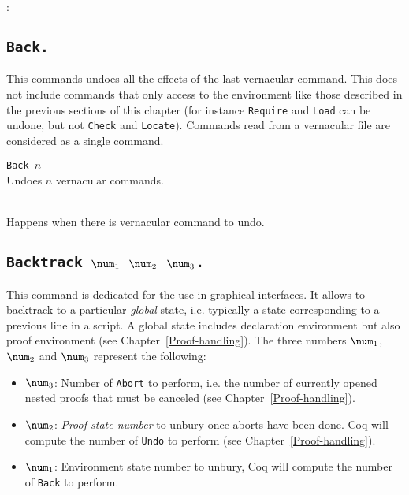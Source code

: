 \begin{ErrMsgs}
\item \ident: 
\end{ErrMsgs}

\subsection[\tt Back.]{\tt Back.}

This commands undoes all the effects of the last vernacular
command. This does not include commands that only access to the
environment like those described in the previous sections of this
chapter (for instance {\tt Require} and {\tt Load} can be undone, but
not {\tt Check} and {\tt Locate}). Commands read from a vernacular
file are considered as a single command.

\begin{Variants}
\item {\tt Back $n$} \\
  Undoes $n$ vernacular commands.
\end{Variants}

\begin{ErrMsgs}
\item {} \\
  Happens when there is vernacular command to undo.
\end{ErrMsgs}

\subsection[\tt Backtrack $\num_1$ $\num_2$ $\num_3$.]{\tt Backtrack $\num_1$ $\num_2$ $\num_3$.}

This command is dedicated for the use in graphical interfaces.  It
allows to backtrack to a particular \emph{global} state, i.e.
typically a state corresponding to a previous line in a script. A
global state includes declaration environment but also proof
environment (see Chapter~\ref{Proof-handling}). The three numbers
$\num_1$, $\num_2$ and $\num_3$ represent the following:
\begin{itemize}
\item $\num_3$: Number of \texttt{Abort} to perform, i.e. the number
  of currently opened nested proofs that must be canceled (see
  Chapter~\ref{Proof-handling}).
\item $\num_2$: \emph{Proof state number} to unbury once aborts have
  been done. Coq will compute the number of \texttt{Undo} to perform
  (see Chapter~\ref{Proof-handling}).
\item $\num_1$: Environment state number to unbury, Coq will compute
  the number of \texttt{Back} to perform.
\end{itemize}


